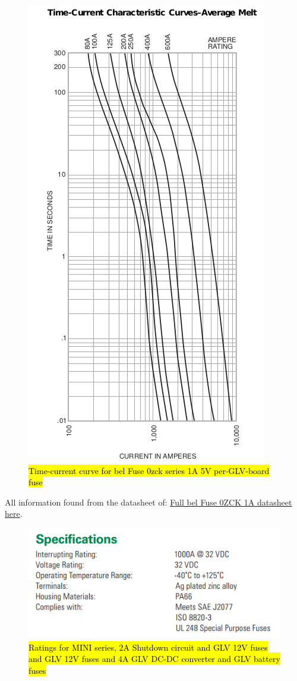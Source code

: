 \documentclass{article}
\DeclareRobustCommand{\hlr}[1]{{\sethlcolor{red}\hl{#1}}}
\begin{document}
\begin{figure}[H]
    \centering
    \includegraphics[width = 0.7 \textwidth]{TSfuseT-Agraph}
    \caption{\hlr{Time-current curve for bel Fuse 0zck series 1A 5V per-GLV-board fuse}}
    \label{5V1Afusecurve}
\end{figure}

All information found from the datasheet of:
\href{http://www.belfuse.com/pdfs/0ZCK.pdf}{Full bel Fuse 0ZCK 1A datasheet here}.

\begin{figure}[H]
    \centering
    \includegraphics[width = 0.6 \textwidth]{shutdownfuseratings}
    \caption{\hlr{Ratings for MINI series, 2A Shutdown circuit and GLV 12V fuses and GLV 12V fuses and 4A GLV DC-DC converter and GLV battery fuses}}
    \label{shutdownfuseratings}
\end{figure}
\end{document}
